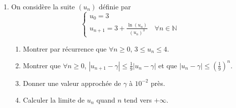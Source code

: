 \begin{exo}
\begin{description}
\begin{enumerate}
\begin{enumerate}
                                          (indication : $x \mapsto \frac{1}{x^3}$ est d\'ecroissante).
                                    \item Montrer que $\forall (a,b) \in [3;4] \times [3;4]$,
                                          $
                                                \left| g(b) - g(a) \right| 
                                                      \leq 
                                                \frac{1}{9} |b-a|
                                          $.
                              \end{enumerate}
                        \item On consid\`ere la suite $(u_n)$ d\'efinie par 
                              \[
                                    \left\lbrace
                                          \begin{array}{l}
                                                u_0 = 3 \\
                                                u_{n+1} =
                                                      \displaystyle{ 3+\frac{\ln (u_n)}{\left( u_n \right)^3} 
                                                                    }
                                                                    \quad \forall n\in\mathbb{N}
                                          \end{array}
                                    \right.
                              \]
                              \begin{enumerate}
                                    \item Montrer par r\'ecurrence que $\forall n \geq 0$, $3 \leq u_n \leq 4$.
                                    \item Montrer que $\forall n \geq 0$,
                                          $
                                          |u_{n+1} - \gamma | \leq \frac{1}{9} |u_n - \gamma |
                                          $
                                          et que 
                                          $
                                          |u_n - \gamma | \leq \left( \frac{1}{9} \right)^n.
                                          $
                                    \item Donner une valeur approch\'ee de $\gamma$ \`a $10^{-2}$ pr\`es.
                                    \item Calculer la limite de $u_n$ quand $n$ tend vers $+\infty$.
                              \end{enumerate}
                  \end{enumerate}
      \end{description}
\end{exo}
